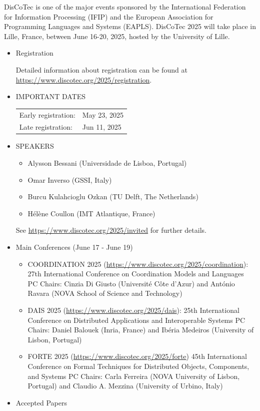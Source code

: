 \documentclass[prodmode,acmtecs]{acmsmall} %
\begin{document}
  DisCoTec is one of the major events sponsored by the International Federation for Information Processing (IFIP) and the European Association for Programming Languages and Systems (EAPLS). DisCoTec 2025 will take place in Lille, France, between June 16-20, 2025, hosted by the University of Lille. \\ 
\begin{itemize}\item  Registration  
 
  Detailed information about registration can be found at \href{https://www.discotec.org/2025/registration}{https://www.discotec.org/2025/registration}. 
 
\item  IMPORTANT DATES 
 
\begin{tabulary}{\linewidth}{LL}Early registration:  & May 23, 2025 \\
Late registration:  & Jun 11, 2025 \\
\end{tabulary}
 
\item  SPEAKERS 
 
\begin{itemize}\item  Alysson Bessani (Universidade de Lisboa, Portugal)
\item  Omar Inverso (GSSI, Italy)
\item  Burcu Kulahcioglu Ozkan (TU Delft, The Netherlands)
\item  Hélène Coullon (IMT Atlantique, France)
\end{itemize} 
  See \href{https://www.discotec.org/2025/invited}{https://www.discotec.org/2025/invited} for further details. 
 
\item  Main Conferences (June 17 - June 19) 
 
\begin{itemize}\item  COORDINATION 2025 (\href{https://www.discotec.org/2025/coordination}{https://www.discotec.org/2025/coordination}): 27th International Conference on Coordination Models and Languages PC Chairs: Cinzia Di Giusto (Université Côte d’Azur) and António Ravara (NOVA School of Science and Technology)
\item  DAIS 2025 (\href{https://www.discotec.org/2025/dais}{https://www.discotec.org/2025/dais}): 25th International Conference on Distributed Applications and Interoperable Systems PC Chairs: Daniel Balouek (Inria, France) and                Ibéria Medeiros (University of Lisbon, Portugal)
\item  FORTE 2025 (\href{https://www.discotec.org/2025/forte}{https://www.discotec.org/2025/forte}) 45th International Conference on Formal Techniques for Distributed Objects, Components, and Systems PC Chairs: Carla Ferreira (NOVA University of Lisbon, Portugal) and Claudio A. Mezzina (University of Urbino, Italy)
\end{itemize} 
\item  Accepted Papers  
 

\end{itemize}
\end{document}
